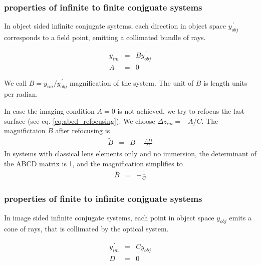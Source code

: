 \documentclass[12pt,a4paper,twoside,openright,BCOR10mm,headsepline,titlepage,abstracton,chapterprefix,final]{scrreprt}
\begin{document}
\subsubsection{properties of infinite to finite conjguate systems}
In object sided infinite conjugate systems, each direction in object space $y^{\,\prime}_{obj}$ corresponds to a field point, 
emitting a collimated bundle of rays.

\begin{eqnarray}
   y_{im} &=& B y^{\,\prime}_{obj} \\
   A &=& 0
\end{eqnarray}

We call $B = y_{im} / y^{\,\prime}_{obj}$ magnification of the system.
The unit of $B$ is length units per radian.

In case the imaging condition $A=0$ is not achieved, we try to refocus the last surface (see eq. \ref{eq:abcd_refocusing}).
We choose $\Delta z_{im} = - A / C $.
The magnifictaion $\tilde{B}$ after refocusing is
\begin{eqnarray}
 \tilde{B} &=& B - \frac{AD}{C} 
\end{eqnarray}
In systems with classical lens elements only and no immersion, the determinant of the ABCD matrix is 1, and the magnification simplifies to
\begin{eqnarray}
 \tilde{B} &=& - \frac{1}{C} 
\end{eqnarray}


\subsubsection{properties of finite to infinite conjguate systems}
In image sided infinite conjugate systems, each point in object space $y_{obj}$ emits a cone of rays, 
that is collimated by the optical system.

\begin{eqnarray}
   y^{\,\prime}_{im} &=& C y_{obj} \\
   D &=& 0
\end{eqnarray}
\end{document}
